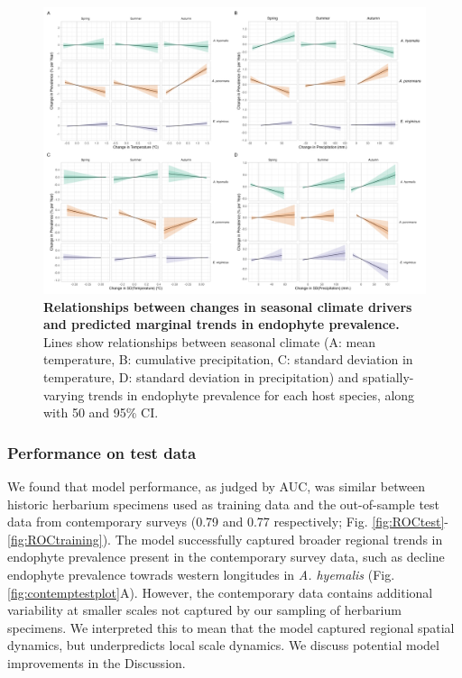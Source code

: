 \documentclass[11pt]{article}
\begin{document}
\begin{figure}[H]
	\centering
	\includegraphics[width = \linewidth]{../Plots/climate_trends_plot.png}
	\caption{\textbf{Relationships between changes in seasonal climate drivers and predicted marginal trends in endophyte prevalence.} Lines show relationships between seasonal climate (A: mean temperature, B: cumulative precipitation, C: standard deviation in temperature, D: standard deviation in precipitation) and spatially-varying trends in endophyte prevalence for each host species, along with 50 and 95\% CI.}
	\label{fig:climate_correlation_plot}
\end{figure}




\subsubsection*{Performance on test data}
We found that model performance, as judged by AUC, was similar between historic herbarium specimens used as training data and the out-of-sample test data from contemporary surveys (0.79 and 0.77 respectively; Fig. \ref{fig:ROCtest}-\ref{fig:ROCtraining}).  
The model successfully captured broader regional trends in endophyte prevalence present in the contemporary survey data, such as decline endophyte prevalence towrads western longitudes in \emph{A. hyemalis}  (Fig. \ref{fig:contemptestplot}A). 
However, the contemporary data contains additional variability at smaller scales not captured by our sampling of herbarium specimens. 
We interpreted this to mean that the model captured regional spatial dynamics, but underpredicts local scale dynamics.
We discuss potential model improvements in the Discussion.
\end{document}
